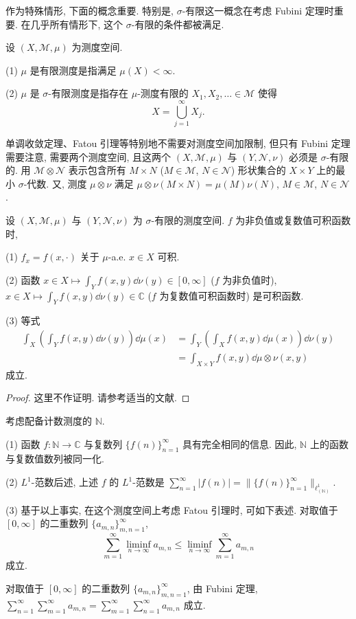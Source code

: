 作为特殊情形, 下面的概念重要. 特别是, $\sigma$-有限这一概念在考虑 Fubini 定理时重要. 在几乎所有情形下, 这个 $\sigma$-有限的条件都被满足.

\begin{definition}\label{def:2.17}
设 $(X, \mathcal{M}, \mu)$ 为测度空间.

(1) $\mu$ 是有限测度是指满足 $\mu(X) < \infty$.

(2) $\mu$ 是 $\sigma$-有限测度是指存在 $\mu$-测度有限的 $X_{1}, X_{2}, \ldots \in \mathcal{M}$ 使得
\[
X = \bigcup_{j=1}^{\infty}X_{j}.
\]
\end{definition}

单调收敛定理、Fatou 引理等特别地不需要对测度空间加限制, 但只有 Fubini 定理需要注意, 需要两个测度空间, 且这两个 $(X, \mathcal{M}, \mu)$ 与 $(Y, \mathcal{N}, \nu)$ 必须是 $\sigma$-有限的. 用 $\mathcal{M} \otimes \mathcal{N}$ 表示包含所有 $M \times N$ ($M \in \mathcal{M}$, $N \in \mathcal{N}$) 形状集合的 $X \times Y$ 上的最小 $\sigma$-代数. 又, 测度 $\mu \otimes \nu$ 满足 $\mu \otimes \nu(M \times N) = \mu(M)\nu(N)$, $M \in \mathcal{M}$, $N \in \mathcal{N}$.

\begin{theorem}[Fubini 定理]\label{thm:2.14}
设 $(X, \mathcal{M}, \mu)$ 与 $(Y, \mathcal{N}, \nu)$ 为 $\sigma$-有限的测度空间. $f$ 为非负值或复数值可积函数时,

(1) $f_{x} = f(x, \cdot)$ 关于 $\mu$-a.e. $x \in X$ 可积.

(2) 函数 $x \in X \mapsto \int_{Y}f(x, y)\dd\nu(y) \in [0, \infty]$ ($f$ 为非负值时), $x \in X \mapsto \int_{Y}f(x, y)\dd\nu(y) \in \mathbb{C}$ ($f$ 为复数值可积函数时) 是可积函数.

(3) 等式
\begin{align*}
\int_{X}\left(\int_{Y}f(x, y)\dd\nu(y)\right)\dd\mu(x) &= \int_{Y}\left(\int_{X}f(x, y)\dd\mu(x)\right)\dd\nu(y) \\
&= \int_{X \times Y}f(x, y)\dd\mu \otimes \nu(x, y)
\end{align*}
成立.
\end{theorem}

\begin{proof}
这里不作证明. 请参考适当的文献.
\end{proof}

\begin{example}\label{exa:2.2}
考虑配备计数测度的 $\mathbb{N}$.

(1) 函数 $f: \mathbb{N} \to \mathbb{C}$ 与复数列 $\{f(n)\}_{n=1}^{\infty}$ 具有完全相同的信息. 因此, $\mathbb{N}$ 上的函数与复数值数列被同一化.

(2) $L^{1}$-范数后述, 上述 $f$ 的 $L^{1}$-范数是 $\sum_{n=1}^{\infty}|f(n)| = \|\{f(n)\}_{n=1}^{\infty}\|_{\ell_{(\mathbb{N})}^{1}}$.

(3) 基于以上事实, 在这个测度空间上考虑 Fatou 引理时, 可如下表述. 对取值于 $[0, \infty]$ 的二重数列 $\{a_{m,n}\}_{m,n=1}^{\infty}$,
\[
\sum_{m=1}^{\infty}\liminf_{n \to \infty}a_{m,n} \leq \liminf_{n \to \infty}\sum_{m=1}^{\infty}a_{m,n}
\]
成立.
\end{example}

\begin{example}\label{exa:2.3}
对取值于 $[0, \infty]$ 的二重数列 $\{a_{m,n}\}_{m,n=1}^{\infty}$, 由 Fubini 定理, $\sum_{n=1}^{\infty}\sum_{m=1}^{\infty}a_{m,n} = \sum_{m=1}^{\infty}\sum_{n=1}^{\infty}a_{m,n}$ 成立.
\end{example}
